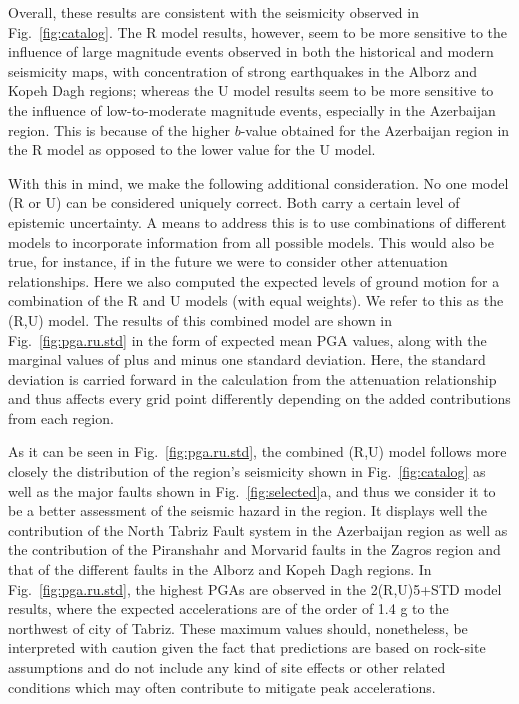 Overall, these results are consistent with the seismicity observed in Fig.~\ref{fig:catalog}. The R model results, however, seem to be more sensitive to the influence of large magnitude events observed in both the historical and modern seismicity maps, with concentration of strong earthquakes in the Alborz and Kopeh Dagh regions; whereas the U model results seem to be more sensitive to the influence of low-to-moderate magnitude events, especially in the Azerbaijan region. This is because of the higher $b$-value obtained for the Azerbaijan region in the R model as opposed to the lower value for the U model.

With this in mind, we make the following additional consideration. No one model (R or U) can be considered uniquely correct. Both carry a certain level of epistemic uncertainty. A means to address this is to use combinations of different models to incorporate information from all possible models. This would also be true, for instance, if in the future we were to consider other attenuation relationships. Here we also computed the expected levels of ground motion for a combination of the R and U models (with equal weights). We refer to this as the (R,U) model. The results of this combined model are shown in Fig.~\ref{fig:pga.ru.std} in the form of expected mean PGA values, along with the marginal values of plus and minus one standard deviation. Here, the standard deviation is carried forward in the calculation from the attenuation relationship and thus affects every grid point differently depending on the added contributions from each region. 

As it can be seen in Fig.~\ref{fig:pga.ru.std}, the combined (R,U) model follows more closely the distribution of the region's seismicity shown in Fig.~\ref{fig:catalog} as well as the major faults shown in Fig.~\ref{fig:selected}a, and thus we consider it to be a better assessment of the seismic hazard in the region. It displays well the contribution of the North Tabriz Fault system in the Azerbaijan region as well as the contribution of the Piranshahr and Morvarid faults in the Zagros region and that of the different faults in the Alborz and Kopeh Dagh regions. In Fig.~\ref{fig:pga.ru.std}, the highest PGAs are observed in the 2(R,U)5+STD model results, where the expected accelerations are of the order of 1.4 g to the northwest of city of Tabriz. These maximum values should, nonetheless, be interpreted with caution given the fact that predictions are based on rock-site assumptions and do not include any kind of site effects or other related conditions which may often contribute to mitigate peak accelerations.

